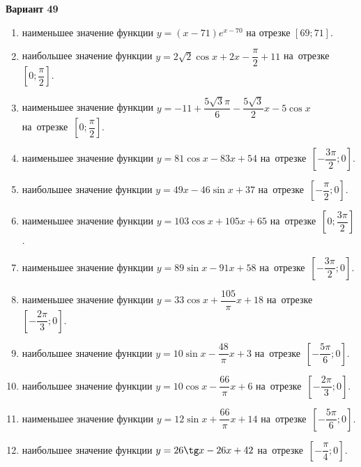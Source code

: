 \documentclass[a4paper,10pt]{article}
\begin{document}
\begin{center}\Large\textbf{Вариант 49}\end{center}

\begin{enumerate}
\item {} наименьшее значение функции $y = \left(x-71\right)e^{x-70}$ на отрезке $\left[69;71\right]$.

\item {} наибольшее значение функции $y = 2\sqrt{2}\cos x+2x-\dfrac{\pi}{2} +11$ на~отрезке~$\left[0;\dfrac{\pi }{2}\right]$.

\item {} наименьшее значение функции $y = -11+\dfrac{5\sqrt{3} \pi}{6}-\dfrac{5\sqrt{3}}{2}x-5\cos x$ на~отрезке~$\left[0;\dfrac{\pi }{2}\right]$.

\item {} наименьшее значение функции $y = 81\cos x-83x+54$ на~отрезке~$\left[-\dfrac{3\pi }{2};0\right]$.

\item {} наибольшее значение функции $y = 49x-46\sin x+37$ на~отрезке~$\left[-\dfrac{\pi }{2};0\right]$.

\item {} наименьшее значение функции $y = 103\cos x+105x+65$ на~отрезке~$\left[0;\dfrac{3\pi }{2}\right]$.

\item {} наименьшее значение функции $y = 89\sin x-91x+58$ на~отрезке~$\left[-\dfrac{3\pi }{2};0\right]$.

\item {} наименьшее значение функции $y = 33\cos x+\dfrac{105}{\pi }x +18$ на~отрезке~$\left[-\dfrac{2\pi }{3};0\right]$.

\item {} наибольшее значение функции $y = 10\sin x-\dfrac{48}{\pi }x+3$ на~отрезке~$\left[-\dfrac{5\pi }{6};0\right]$.

\item {} наибольшее значение функции $y = 10\cos x-\dfrac{66}{\pi }x+6$ на~отрезке~$\left[-\dfrac{2\pi }{3};0\right]$.

\item {} наименьшее значение функции $y = 12\sin x+\dfrac{66}{\pi }x+14$ на~отрезке~$\left[-\dfrac{5\pi }{6};0\right]$.

\item {} наибольшее значение функции $y = 26\tg x-26x+42$ на~отрезке~$\left[-\dfrac{\pi }{4};0\right]$.


\end{enumerate}
\end{document}
